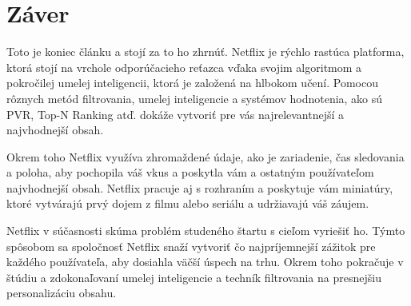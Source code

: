 \documentclass[10pt,slovak,a4paper]{article}
\begin{document}
\section{Záver}
Toto je koniec článku a stojí za to ho zhrnúť. Netflix je rýchlo rastúca platforma, ktorá stojí na vrchole odporúčacieho reťazca vďaka svojim algoritmom a pokročilej umelej inteligencii, ktorá je založená na hlbokom učení. Pomocou rôznych metód filtrovania, umelej inteligencie a systémov hodnotenia, ako sú PVR, Top-N Ranking atď. dokáže vytvoriť pre vás najrelevantnejší a najvhodnejší obsah.

Okrem toho Netflix využíva zhromaždené údaje, ako je zariadenie, čas sledovania a poloha, aby pochopila váš vkus a poskytla vám a ostatným používateľom najvhodnejší obsah. Netflix pracuje aj s rozhraním a poskytuje vám miniatúry, ktoré vytvárajú prvý dojem z filmu alebo seriálu a udržiavajú váš záujem.\cite{Zaver}

Netflix v súčasnosti skúma problém studeného štartu s cieľom vyriešiť ho. Týmto spôsobom sa spoločnosť Netflix snaží vytvoriť čo najpríjemnejší zážitok pre každého používateľa, aby dosiahla väčší úspech na trhu. Okrem toho pokračuje v štúdiu a zdokonaľovaní umelej inteligencie a techník filtrovania na presnejšiu personalizáciu obsahu.
 
\nocite{DeepL}


 
\end{document}
